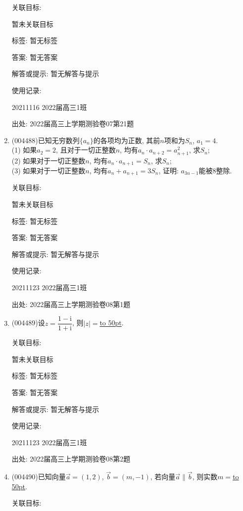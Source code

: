 \documentclass[10pt,a4paper]{article}
\newcommand{\blank}[1]{\underline{\hbox to #1pt{}}}
\begin{document}
\begin{enumerate}[1.]
关联目标:

暂未关联目标



标签: 暂无标签

答案: 暂无答案

解答或提示: 暂无解答与提示

使用记录:

20211116	2022届高三1班			


出处: 2022届高三上学期测验卷07第21题
\item { (004488)}已知无穷数列$\{a_n\}$的各项均为正数, 其前$n$项和为$S_n$, $a_1=4$.\\
(1) 如果$a_2=2$, 且对于一切正整数$n$, 均有$a_n\cdot a_{n+2}=a_{n+1}^2$, 求$S_n$;\\
(2) 如果对于一切正整数$n$, 均有$a_n\cdot a_{n+1}=S_n$, 求$S_n$;\\
(3) 如果对于一切正整数$n$, 均有$a_n+a_{n+1}=3S_n$, 证明: $a_{3n-1}$能被$8$整除.


关联目标:

暂未关联目标



标签: 暂无标签

答案: 暂无答案

解答或提示: 暂无解答与提示

使用记录:

20211123	2022届高三1班	


出处: 2022届高三上学期测验卷08第1题
\item { (004489)}设$z=\dfrac{1-\mathrm{i}}{1+\mathrm{i}}$, 则$|z|=$\blank{50}.


关联目标:

暂未关联目标



标签: 暂无标签

答案: 暂无答案

解答或提示: 暂无解答与提示

使用记录:

20211123	2022届高三1班	


出处: 2022届高三上学期测验卷08第2题
\item { (004490)}已知向量$\overrightarrow a=(1,2)$, $\overrightarrow b=(m,-1)$, 若向量$\overrightarrow a\parallel \overrightarrow b$, 则实数$m=$\blank{50}.


关联目标:


\end{enumerate}
\end{document}
